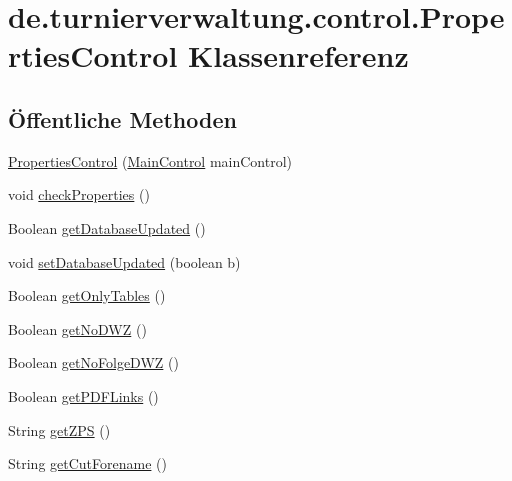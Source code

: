 \hypertarget{classde_1_1turnierverwaltung_1_1control_1_1_properties_control}{}\section{de.\+turnierverwaltung.\+control.\+Properties\+Control Klassenreferenz}
\label{classde_1_1turnierverwaltung_1_1control_1_1_properties_control}
\subsection*{Öffentliche Methoden}
\begin{DoxyCompactItemize}
\item 
\hyperlink{classde_1_1turnierverwaltung_1_1control_1_1_properties_control_a59276849671864be3a51692225f91300}{Properties\+Control} (\hyperlink{classde_1_1turnierverwaltung_1_1control_1_1_main_control}{Main\+Control} main\+Control)
\item 
void \hyperlink{classde_1_1turnierverwaltung_1_1control_1_1_properties_control_abf6c1599ee3567fb355d18bdce1e400a}{check\+Properties} ()
\item 
Boolean \hyperlink{classde_1_1turnierverwaltung_1_1control_1_1_properties_control_af6cfb97c8d507fc7e653e80afe5eaf95}{get\+Database\+Updated} ()
\item 
void \hyperlink{classde_1_1turnierverwaltung_1_1control_1_1_properties_control_a743dc4db891f64c6abbf9dde28e28140}{set\+Database\+Updated} (boolean b)
\item 
Boolean \hyperlink{classde_1_1turnierverwaltung_1_1control_1_1_properties_control_a67a2a241e54282eb03d05828a25f98d4}{get\+Only\+Tables} ()
\item 
Boolean \hyperlink{classde_1_1turnierverwaltung_1_1control_1_1_properties_control_ae8f748022b20f3531f4151e3c0698fb3}{get\+No\+D\+WZ} ()
\item 
Boolean \hyperlink{classde_1_1turnierverwaltung_1_1control_1_1_properties_control_ae53859f10a508d01ccea530252d1d941}{get\+No\+Folge\+D\+WZ} ()
\item 
Boolean \hyperlink{classde_1_1turnierverwaltung_1_1control_1_1_properties_control_a47b8a0be6c8c126ac2f1be0cc56d753c}{get\+P\+D\+F\+Links} ()
\item 
String \hyperlink{classde_1_1turnierverwaltung_1_1control_1_1_properties_control_a8eaa00453cfdc304bbac546380ec7ac0}{get\+Z\+PS} ()
\item 
String \hyperlink{classde_1_1turnierverwaltung_1_1control_1_1_properties_control_a2402427fc6063322672fc4f5e24d78b9}{get\+Cut\+Forename} ()

\end{DoxyCompactItemize}
